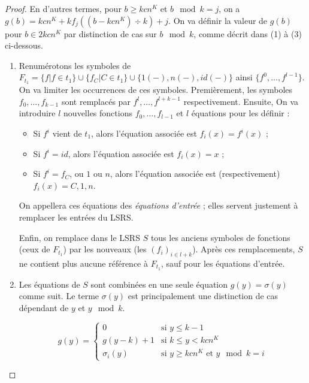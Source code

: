 \documentclass{report}
\begin{document}
\begin{proof}
{\begin{minipage}{0.9\textwidth}
				\end{minipage}
			}
				
				\espace
			
			
			En d'autres termes, pour $b \geqslant kcn^K$ et $b \mod{k} = j$, on a $g(b) = kcn^K + k f_j\left( (b-kcn^K) \div k \right) + j$.
			On va définir la valeur de $g(b)$ pour $b \in 2kcn^K$ par distinction de cas sur $b \mod{k}$, comme décrit dans (1) à (3) ci-dessous.
			
			\begin{enumerate}[itemsep=-1mm,leftmargin=2cm]
				\item  
					Renumérotons les symboles de $F_{t_1} = \{f | f \in t_1\} \cup \{f_C | C \in t_1\} \cup \{1(-), n(-), id(-)\}$ ainsi $\{ f^0, \dots, f^{l-1} \}$. On va limiter les occurrences de ces symboles. Premièrement, les symboles $f_0, \dots, f_{k-1}$ sont remplacés par $f^{l}, \dots, f^{l+k-1}$ respectivement. Ensuite, On va introduire $l$ nouvelles fonctions $f_0, \dots, f_{l-1}$ et $l$ équations pour les définir :
					
						\begin{itemize}[itemsep=-1mm,leftmargin=1cm]
							\item	Si $f^i$ vient de $t_1$, alors l'équation associée est $f_i(x) = f^i(x)$ ;
							\item 	Si $f^i = id$, alors l'équation associée est $f_i(x) = x$ ;
							\item 	Si $f^i = f_C$, ou $1$ ou $n$, alors l'équation associée est (respectivement) $f_i(x) = C, 1, n$. 
						\end{itemize}
				
					
					On appellera ces équations des \emph{équations d'entrée} ; elles servent justement à remplacer les entrées du LSRS.
					
					Enfin, on remplace dans le LSRS $S$ tous les anciens symboles de fonctions (ceux de $F_{t_1}$) par les nouveaux (les $(f_i)_{i \in l+k}$). Après ces remplacements, $S$ ne contient plus aucune référence à $F_{t_1}$, sauf pour les équations d'entrée. 
					
				\item 	
					Les équations de $S$ sont combinées en une seule équation $g(y) = \sigma(y)$ comme suit. Le terme $\sigma(y)$ est principalement une distinction de cas dépendant de $y$ et $y \mod{k}$. 
				
					\[
						g(y) = 
							\left\lbrace \begin{array}{ll}
								0 				& \text{si $y \leqslant k-1$} \\
								g(y-k) + 1 		& \text{si $k \leqslant y < kcn^K$} \\
								\sigma_i(y)		& \text{si $y \geqslant kcn^K$ et $y \mod{k} = i$}
							\end{array}\right.
					\]
					

\end{enumerate}
\end{proof}
\end{document}
